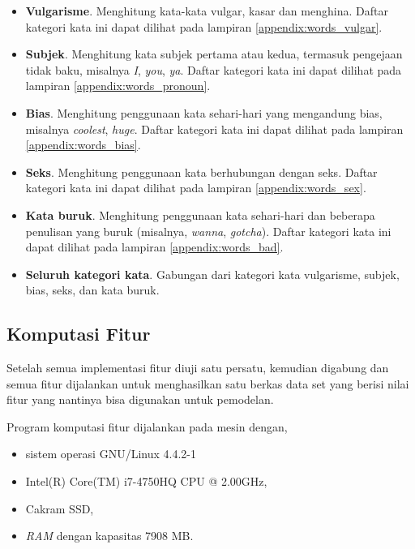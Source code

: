 \begin{itemize}
\item \textbf{Vulgarisme}.
Menghitung kata-kata vulgar, kasar dan menghina.
Daftar kategori kata ini dapat dilihat pada lampiran
\ref{appendix:words_vulgar}.

\item \textbf{Subjek}.
Menghitung kata subjek pertama atau kedua, termasuk pengejaan tidak baku,
misalnya \textit{I}, \textit{you}, \textit{ya}.
Daftar kategori kata ini dapat dilihat pada lampiran
\ref{appendix:words_pronoun}.

\item \textbf{Bias}.
Menghitung penggunaan kata sehari-hari yang mengandung bias, misalnya
\textit{coolest}, \textit{huge}.
Daftar kategori kata ini dapat dilihat pada lampiran
\ref{appendix:words_bias}.

\item \textbf{Seks}.
Menghitung penggunaan kata berhubungan dengan seks.
Daftar kategori kata ini dapat dilihat pada lampiran
\ref{appendix:words_sex}.

\item \textbf{Kata buruk}.
Menghitung penggunaan kata sehari-hari dan beberapa penulisan yang buruk
(misalnya, \textit{wanna}, \textit{gotcha}).
Daftar kategori kata ini dapat dilihat pada lampiran
\ref{appendix:words_bad}.

\item \textbf{Seluruh kategori kata}.
Gabungan dari kategori kata vulgarisme, subjek, bias, seks, dan kata buruk.

\end{itemize}

\subsection{Komputasi Fitur}

Setelah semua implementasi fitur diuji satu persatu, kemudian digabung dan
semua fitur dijalankan untuk menghasilkan satu berkas data set yang berisi
nilai fitur yang nantinya bisa digunakan untuk pemodelan.

Program komputasi fitur dijalankan pada mesin dengan,

\begin{itemize}
\item sistem operasi GNU/Linux 4.4.2-1
\item Intel(R) Core(TM) i7-4750HQ CPU @ 2.00GHz,
\item Cakram SSD,
\item \textit{RAM} dengan kapasitas 7908 MB.
\end{itemize}

